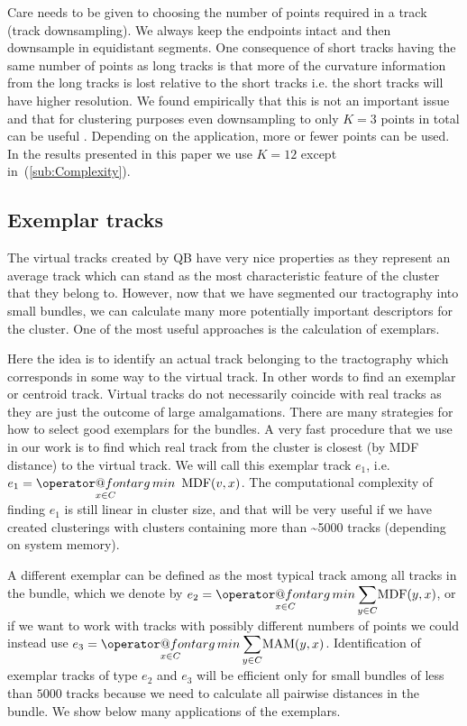 \documentclass[journal]{IEEEtran}
\makeatletter
\def\argmin{\mathop{\operator@font arg\,min}}
\makeatother
\begin{document}
Care needs to be given to choosing the number of points required in a
track (track downsampling). We always keep the endpoints intact and then
downsample in equidistant segments. One consequence of short tracks
having the same number of points as long tracks is that more of the
curvature information from the long tracks is lost relative to the short
tracks i.e. the short tracks will have higher resolution.  We found
empirically that this is not an important issue and that for clustering
purposes even downsampling to only $K=3$ points in total can be useful
\cite{EGMB10}. Depending on the application, more or fewer points can
be used. In the results presented in this paper we use $K=12$ except
in~(\ref{sub:Complexity}).


\subsection{Exemplar tracks\label{sub:exemplars}}

The virtual tracks created by QB have very nice properties as they
represent an average track which can stand as the most characteristic
feature of the cluster that they belong to. However, now that we have
segmented our tractography into small bundles, we can calculate many more
potentially important descriptors for the cluster. One of the most
useful approaches is the calculation of exemplars.

Here the idea is to identify an actual track belonging to the
tractography which corresponds in some way to the virtual track. In
other words to find an exemplar or centroid track. Virtual tracks do not
necessarily coincide with real tracks as they are just the outcome of
large amalgamations. There are many strategies for how to select good
exemplars for the bundles. A very fast procedure that we use in our
work is to find which real track from the cluster is closest (by MDF
distance) to the virtual track. We will call this exemplar track $e_{1}$,
i.e.~$e_{1}={\displaystyle \argmin_{x\in C}}\textrm{\,\ MDF}(v,x)$.
The computational complexity of finding $e_{1}$ is still linear in
cluster size, and that will be very useful if we have created
clusterings with clusters containing more than \textasciitilde5000 tracks
(depending on system memory).

A different exemplar can be defined as the most typical track among all
tracks in the bundle, which we denote by $e_{2}={\displaystyle
  \argmin_{x\in C}}\,{\displaystyle \sum_{y\in C}}\mathrm{MDF}(y,x)$, or
if we want to work with tracks with possibly different numbers of points
we could instead use $e_{3}={\displaystyle \argmin_{x\in
    C}}\,{\displaystyle \sum_{y\in C}}\mathrm{MAM}(y,x)$.
Identification of exemplar tracks of type $e_{2}$ and $e_{3}$ will be
efficient only for small bundles of less than $5000$ tracks because we
need to calculate all pairwise distances in the bundle. We show below
many applications of the exemplars. 
\end{document}
